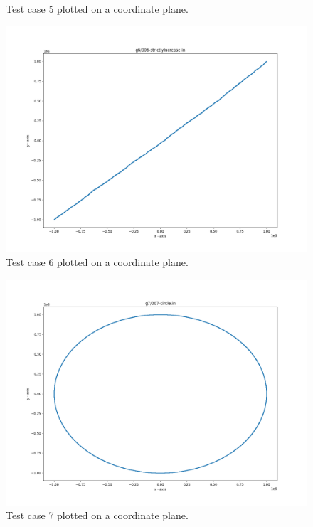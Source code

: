 \documentclass{article}
\begin{document}
\begin{appendices}
\begin{figure}[H]
	\caption{Test case 5 plotted on a coordinate plane.}
	\label{fig:05}
\end{figure}
\begin{figure}[H]
	\centering
	\includegraphics[scale=0.38]{code/visualizer/testdata/06.png}
	\caption{Test case 6 plotted on a coordinate plane.}
	\label{fig:06}
\end{figure}
\begin{figure}[H]
	\centering
	\includegraphics[scale=0.4]{code/visualizer/testdata/07.png}
	\caption{Test case 7 plotted on a coordinate plane.}
	\label{fig:07}
\end{figure}
\begin{figure}[H]
	\centering

\end{figure}
\end{appendices}
\end{document}
